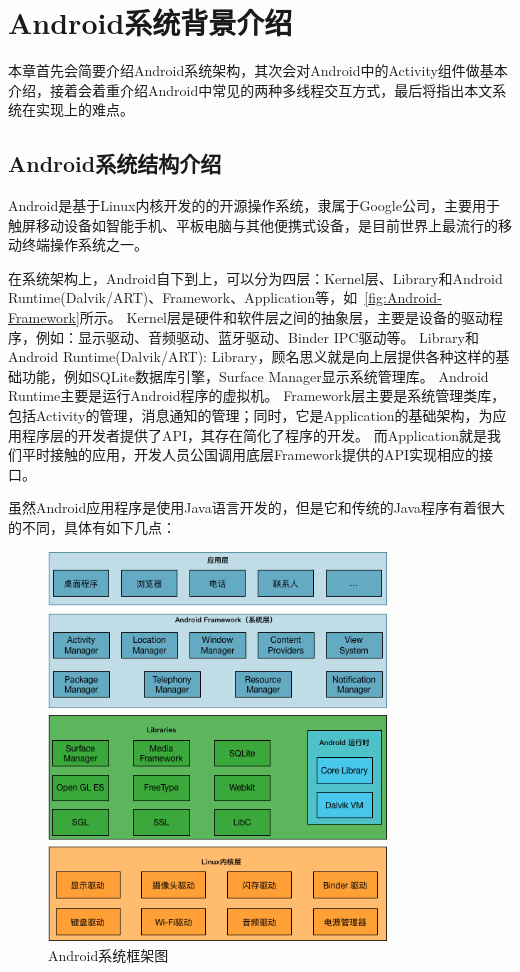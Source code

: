 \chapter{Android系统背景介绍 }  
\label{chp:background}


本章首先会简要介绍Android系统架构，其次会对Android中的Activity组件做基本介绍，接着会着重介绍Android中常见的两种多线程交互方式，最后将指出本文系统在实现上的难点。

\section{Android系统结构介绍}

Android是基于Linux内核开发的的开源操作系统，隶属于Google公司，主要用于触屏移动设备如智能手机、平板电脑与其他便携式设备，是目前世界上最流行的移动终端操作系统之一。


在系统架构上，Android自下到上，可以分为四层：Kernel层、Library和Android Runtime(Dalvik/ART)、Framework、Application等，如~\autoref{fig:Android-Framework}所示。
Kernel层是硬件和软件层之间的抽象层，主要是设备的驱动程序，例如：显示驱动、音频驱动、蓝牙驱动、Binder IPC驱动等。
Library和Android Runtime(Dalvik/ART): Library，顾名思义就是向上层提供各种这样的基础功能，例如SQLite数据库引擎，Surface Manager显示系统管理库。
Android Runtime主要是运行Android程序的虚拟机。
Framework层主要是系统管理类库，包括Activity的管理，消息通知的管理；同时，它是Application的基础架构，为应用程序层的开发者提供了API，其存在简化了程序的开发。
而Application就是我们平时接触的应用，开发人员公国调用底层Framework提供的API实现相应的接口。

虽然Android应用程序是使用Java语言开发的，但是它和传统的Java程序有着很大的不同，具体有如下几点：

\begin{figure}[!h]
	\centering
	\includegraphics[width=0.8\textwidth]{./Figures/Android-Framework.png}
	\caption{Android系统框架图}
	\label{fig:Android-Framework}
\end{figure}


